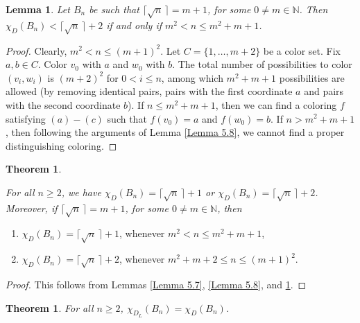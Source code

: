 \documentclass[12pt,reqno,a4paper]{amsart}
\theoremstyle{definition}
\newtheorem{thm}[defn]{Theorem}
\newtheorem{lem}[defn]{Lemma}
\begin{document}
\begin{lem}\label{Lemma 5.9}
   {\em Let $B_n$ be such that $\lceil \sqrt{n}\,\rceil = m+1$, for some $0\neq m\in \mathbb{N}$. Then $\chi_{D}(B_n) < \lceil \sqrt{n}\,\rceil + 2$ if and only if $m^2 < n \leq m^2 + m+1$.}
\end{lem}
\begin{proof}
    Clearly, $m^2<n\leq (m+1)^2$. Let $C = \{1,\dots, m+2\}$ be a color set. Fix $a,b\in C$. Color $v_0$ with $a$ and $w_0$ with $b$. The total number of possibilities to color $(v_i,w_i)$ is $(m+2)^2$ for $0<i\leq n$, among which $m^2 + m + 1$ possibilities are allowed (by removing identical pairs, pairs with the first coordinate $a$ and pairs with the second coordinate $b$). If $n\leq m^2 + m + 1$, then we can find a coloring $f$ satisfying $(a)-(c)$ such that $f(v_0) = a$ and $f(w_0) = b$. If $n> m^2 + m + 1$, then following the arguments of Lemma \ref{Lemma 5.8}, we cannot find a proper distinguishing coloring.
\end{proof}

\begin{thm}\label{Theorem 5.10}
    {\em For all $n\geq 2$, we have $\chi_D(B_n) = \lceil \sqrt{n}\,\rceil + 1$ or $\chi_D(B_n) = \lceil \sqrt{n}\,\rceil + 2$. Moreover, if $\lceil \sqrt{n}\,\rceil = m+1$, for some $0\neq m\in \mathbb{N}$, then
    \begin{enumerate}
        \item[(i)] $\chi_D(B_n) = \lceil \sqrt{n}\,\rceil + 1$, whenever $m^2 < n\leq m^2 + m + 1$,
        \item[(ii)]  $\chi_D(B_n) = \lceil \sqrt{n}\,\rceil + 2$, whenever $m^2 +m + 2\leq n \leq (m+1)^2$.
    \end{enumerate}}
\end{thm}
\begin{proof}
     This follows from Lemmas \ref{Lemma 5.7}, \ref{Lemma 5.8}, and \ref{Lemma 5.9}.
\end{proof}


\begin{thm}\label{Theorem 5.11}
  {\em For all $n\geq 2$, $\chi_{D_L}(B_n) = \chi_D(B_n)$.}
\end{thm}
\end{document}
